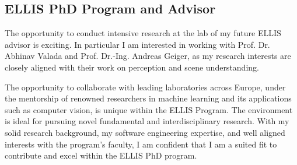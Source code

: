 \subsection{\textbf{ELLIS PhD Program and Advisor}}
The opportunity to conduct intensive research at the lab of my future ELLIS advisor is exciting. In particular I am interested in working with Prof. Dr. Abhinav Valada and Prof. Dr.-Ing. Andreas Geiger, as my research interests are closely aligned with their work on perception and scene understanding.

The opportunity to collaborate with leading laboratories across Europe, under the mentorship of renowned researchers in machine learning and its applications such as computer vision, is unique within the ELLIS Program. The environment is ideal for pursuing novel fundamental and interdisciplinary research. With my solid research background, my software engineering expertise, and well aligned interests with the program’s faculty, I am confident that I am a suited fit to contribute and excel within the ELLIS PhD program.